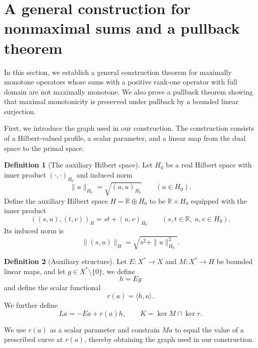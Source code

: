 \documentclass[11pt]{article}
\newcommand{\R}{\mathbb R}
\newcommand{\pair}[2]{\langle #1,#2\rangle}
\theoremstyle{definition}
\newtheorem{definition}{Definition}
\theoremstyle{remark}
\begin{document}
\section{A general construction for nonmaximal sums and a pullback theorem}
\label{sec:endpoint-criterion}

In this section, we establish a general construction theorem for maximally monotone operators whose sums with a positive rank-one operator with full domain are not maximally monotone. We also prove a pullback theorem showing that maximal monotonicity is preserved under pullback by a bounded linear surjection.  






First, we introduce the graph used in our construction. The construction consists of a Hilbert-valued profile, a scalar parameter, and a linear map from the dual space to the primal space. 


\begin{definition}[The auxiliary Hilbert space]
\label{def:hilbert-spaces-norms}
Let $H_0$ be a real Hilbert space with inner product $(\cdot,\cdot)_{H_0}$ and induced norm
\[
\|u\|_{H_0}=\sqrt{(u,u)_{H_0}}\qquad(u\in H_0).
\]
Define the auxiliary Hilbert space $H=\R\oplus H_0$ to be $\R\times H_0$ equipped with the inner product
\[
((s,u),(t,v))_H=st+(u,v)_{H_0}
\qquad(s,t\in\R,\ u,v\in H_0).
\]
Its induced norm is
\[
\|(s,u)\|_H=\sqrt{s^2+\|u\|_{H_0}^2}.
\]
\end{definition}


\begin{definition}[Auxiliary structure]
\label{def:construction-maps}
Let $E:X^*\to X$ and $M:X^*\to H$ be bounded linear maps, and let
$g\in X^*\setminus\{0\}$, we define 
\[
h=Eg
\]
and define the scalar functional
\[
r(a)=\pair{h}{a}.
\]
We further define
\[
La=-Ea+r(a)h,
\qquad
K=\ker M\cap\ker r.
\]
\end{definition}



We use $r(a)$ as a scalar parameter and constrain $Ma$ to equal the value of a prescribed curve at $r(a)$, thereby obtaining the graph used in our construction. 
\end{document}
